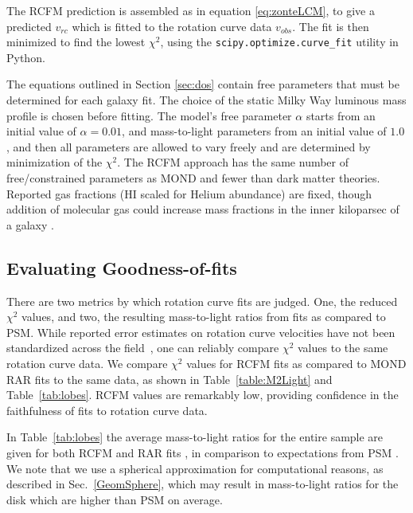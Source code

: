 \documentclass[reprint,%
 amsmath,amssymb,
 aps,
]{revtex4-1}
\begin{document}

The RCFM prediction is    assembled as in equation \ref{eq:zonteLCM}, to give a predicted $v_{rc}$ which is fitted to the rotation curve data $v_{obs}$. The fit is then minimized to find the  lowest   $\chi^2$,  using the {\tt scipy.optimize.curve\_fit} utility in Python.

The equations outlined in Section \ref{sec:dos} contain   free parameters that must be determined for each galaxy fit. The choice of the static Milky Way luminous mass profile is chosen before fitting. The     model's free parameter $\alpha$ starts from  an initial value of $\alpha = 0.01$, and  mass-to-light parameters from an initial value of $1.0$, and then all parameters are     allowed to vary freely and are determined by  minimization of the $\chi^2$. 
The RCFM approach  has  the same number of free/constrained parameters as MOND and fewer than dark matter theories.
 Reported gas fractions (HI scaled for Helium abundance) are fixed,  though addition of molecular gas could increase mass fractions in the inner kiloparsec of a galaxy   \cite{2004ApJ...609..652M}.  







\subsection{Evaluating Goodness-of-fits}

There are two metrics by which rotation curve fits are judged. One, the reduced  $\chi^2$ values, and 
 two, the resulting mass-to-light ratios from   fits as compared to   PSM.  While reported error    estimates on rotation curve velocities  have not been standardized across the field~\citep{Blok,Gent},     one can reliably   compare $\chi^{2}$ values  to the same rotation curve data. 
 We compare  $\chi^{2}$ values for RCFM fits as compared to MOND RAR fits to the same data, as shown in Table~\ref{table:M2Light} and Table~\ref{tab:lobes}. RCFM values are remarkably low, providing confidence in the faithfulness of fits to rotation curve data. 

  
 In Table~\ref{tab:lobes}  the    average mass-to-light ratios for the entire sample are given for both RCFM and RAR fits ,  in comparison to expectations from PSM \citet{McGaugh2016RAR}.   We note that we     use a  spherical approximation for computational reasons, as described in Sec.~\ref{GeomSphere}, which may result in mass-to-light ratios for the disk which are higher than PSM on average.  
  
\end{document}
